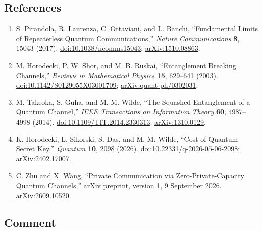 \subsection*{References}

\begin{enumerate}[label={},leftmargin=4.8em,labelsep=0.5em]
  \footnotesize
  \item[\textup{[PLOB17]}]\label{ref:59e9-plob}
  S. Pirandola, R. Laurenza, C. Ottaviani, and L. Banchi, ``Fundamental
  Limits of Repeaterless Quantum Communications,'' \emph{Nature
  Communications} \textbf{8}, 15043 (2017).
  \href{https://doi.org/10.1038/ncomms15043}{doi:10.1038/ncomms15043};
  \href{https://arxiv.org/abs/1510.08863}{arXiv:1510.08863}.

  \item[\textup{[HSR03]}]\label{ref:59e9-hsr}
  M. Horodecki, P. W. Shor, and M. B. Ruskai, ``Entanglement Breaking
  Channels,'' \emph{Reviews in Mathematical Physics} \textbf{15}, 629--641
  (2003).
  \href{https://doi.org/10.1142/S0129055X03001709}{doi:10.1142/S0129055X03001709};
  \href{https://arxiv.org/abs/quant-ph/0302031}{arXiv:quant-ph/0302031}.

  \item[\textup{[TGW14]}]\label{ref:59e9-tgw}
  M. Takeoka, S. Guha, and M. M. Wilde, ``The Squashed Entanglement of a
  Quantum Channel,'' \emph{IEEE Transactions on Information Theory}
  \textbf{60}, 4987--4998 (2014).
  \href{https://doi.org/10.1109/TIT.2014.2330313}{doi:10.1109/TIT.2014.2330313};
  \href{https://arxiv.org/abs/1310.0129}{arXiv:1310.0129}.

  \item[\textup{[HSDW26]}]\label{ref:59e9-hsdw}
  K. Horodecki, L. Sikorski, S. Das, and M. M. Wilde,
  ``Cost of Quantum Secret Key,'' \emph{Quantum} \textbf{10}, 2098 (2026).
  \href{https://doi.org/10.22331/q-2026-05-06-2098}{doi:10.22331/q-2026-05-06-2098};
  \href{https://arxiv.org/abs/2402.17007}{arXiv:2402.17007}.

  \item[\textup{[ZW26]}]\label{ref:59e9-zw}
  C. Zhu and X. Wang, ``Private Communication via Zero-Private-Capacity
  Quantum Channels,'' arXiv preprint, version 1, 9 September 2026.
  \href{https://arxiv.org/abs/2609.10520}{arXiv:2609.10520}.
\end{enumerate}

\subsection*{Comment}

